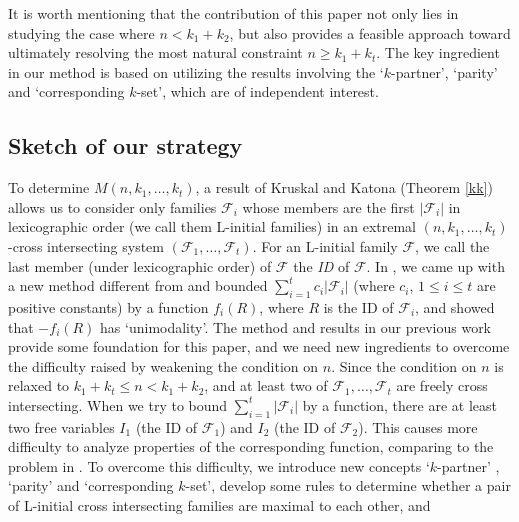 \documentclass[a4paper,11pt]{article}
\begin{document}
\fi


It is worth mentioning that the contribution of this paper not only lies in studying the case where $n<k_1+k_2$, but also provides a feasible approach toward ultimately resolving the most natural constraint $n\geq k_1+k_t$.
The key ingredient in our method is based on
utilizing the results involving the `$k$-partner', `parity' and `corresponding $k$-set', which are of independent interest.

\subsection{Sketch of our strategy}

To determine $M(n, k_1, \dots, k_t)$, a result of Kruskal and Katona (Theorem \ref{kk})  allows us to consider only families $\mathcal{F}_i$ whose members are the first $|\mathcal{F}_i|$  in lexicographic order (we call them  L-initial families) in an extremal $(n, k_1, \dots, k_t)$-cross intersecting system $(\mathcal{F}_1, \dots, \mathcal{F}_t)$.
   For an L-initial family $\mathcal{F}$, we call the last member (under lexicographic order) of $\mathcal{F}$ the {\em ID} of $\mathcal{F}$.
   In \cite{HP+}, we  came up with a new method different from \cite{HPW, ZF2023} and  bounded $\sum_{i=1}^t{c_i|\mathcal{F}_i|}$ (where $c_i$, $1\le i\le t$ are positive constants) by a function  $f_i(R)$, where $R$ is the ID of  $\mathcal{F}_i$,  and showed that $-f_i(R)$ has   `unimodality'. The method and results in our previous work \cite{HP+} provide some foundation for this paper, and we need new ingredients to overcome the difficulty raised by weakening the condition on $n$.  Since the condition on $n$ is relaxed to $k_1+k_t\leq n <k_1+k_2$, and at least two of $\mathcal{F}_1, \dots, \mathcal{F}_t$  are freely cross intersecting.
 When we try to  bound $\sum_{i=1}^t{|\mathcal{F}_i|}$ by a function, there are at least two free variables $I_1$ (the ID of $\mathcal{F}_1$) and $I_2$ (the ID of $\mathcal{F}_2$). This causes more difficulty to analyze properties of the corresponding function, comparing to the problem in \cite{HP+}. To overcome this difficulty,  we introduce new concepts `$k$-partner' , `parity' and `corresponding $k$-set', develop some rules to determine whether  a pair of L-initial cross intersecting families are maximal to each other, and
\end{document}
